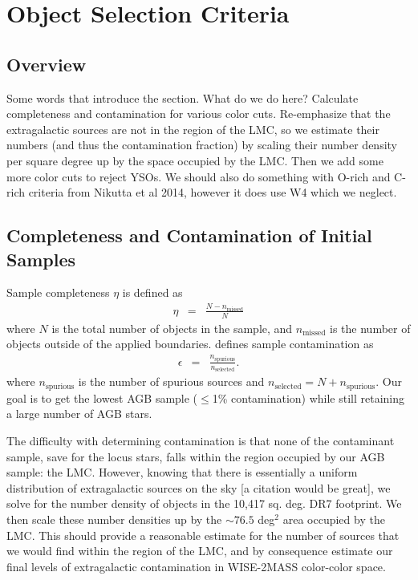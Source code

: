 \section{Object Selection Criteria}
\label{sec:criteria}
\subsection{Overview}
{\color{red}Some words that introduce the section. What do we do here? Calculate completeness and contamination for various color cuts.  Re-emphasize that the extragalactic sources are not in the region of the LMC, so we estimate their numbers (and thus the contamination fraction) by scaling their number density per square degree up by the space occupied by the LMC. Then we add some more color cuts to reject YSOs. We should also do something with O-rich and C-rich criteria from Nikutta et al 2014, however it does use W4 which we neglect.}

\subsection{Completeness and Contamination of Initial Samples}
Sample completeness $\eta$ is defined as
\begin{eqnarray*}
\eta &=& \frac{N - n_\text{missed}}{N}
\end{eqnarray*}
where $N$ is the total number of objects in the sample, and $n_\text{missed}$ is the number of objects outside of the applied boundaries. \cite{2013sdmm.book.....I} defines sample contamination as
\begin{eqnarray*}
\epsilon &=& \frac{n_\text{spurious}}{n_\text{selected}}.
\end{eqnarray*}
where $n_\text{spurious}$ is the number of spurious sources and $n_\text{selected} = N + n_\text{spurious}$. Our goal is to get the lowest AGB sample ($\le$1\% contamination) while still retaining a large number of AGB stars.

The difficulty with determining contamination is that none of the contaminant sample, save for the locus stars,  falls within the region occupied by our AGB sample: the LMC. However, knowing that there is essentially a uniform distribution of extragalactic sources on the sky {\color{red}[a citation would be great]}, we solve for the number density of objects in the 10,417 sq. deg. DR7 footprint. We then scale these number densities up by the $\sim76.5$ deg$^2$ area occupied by the LMC. This should provide a reasonable estimate for the number of sources that we would find within the region of the LMC, and by consequence estimate our final levels of extragalactic contamination in WISE-2MASS color-color space. 

